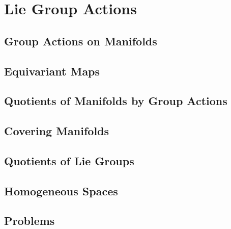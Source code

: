 \chapter{Lie Group Actions}
\section{Group Actions on Manifolds}
\section{Equivariant Maps}
\section{Quotients of Manifolds by Group Actions}
\section{Covering Manifolds}
\section{Quotients of Lie Groups}
\section{Homogeneous Spaces}
\section{Problems}
